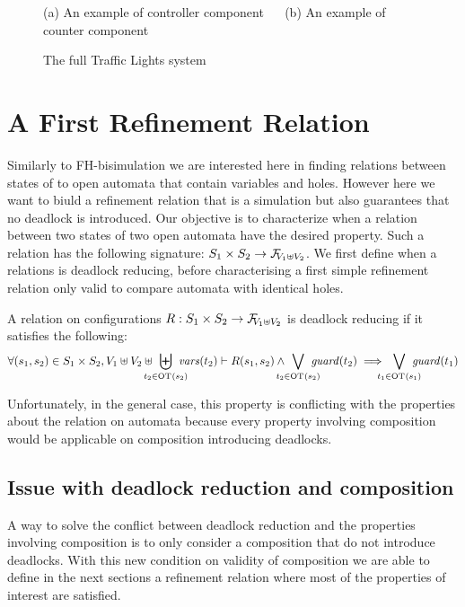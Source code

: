 \documentclass[runningheads]{llncs}
\begin{document}
\begin{figure}


\caption{(a) An example of controller component ~~  (b) An example of counter component}
\label{fig:ctlandcnt}
\end{figure}



\begin{figure}
\centering

\caption{The full Traffic Lights system}
\label{fig:tlf}
\end{figure}


\section{A First Refinement Relation}\label{sec:refinement}

Similarly to FH-bisimulation we are interested here in finding relations between states of to open automata that contain variables and holes. However here we want to biuld a refinement relation that is a simulation but also guarantees that no deadlock is introduced.
Our objective is to characterize when a relation between two states of two open automata have the desired property. Such a relation has the following signature: \( S_1 \times S_2 \to \rformulas[V_1 \uplus V_2]\).
We first define when a relations is deadlock reducing, before characterising a first simple refinement relation only valid to compare automata with identical holes.

\begin{definition}\label{def:dpwd}
A relation on configurations \(R: S_1 \times S_2 \to \rformulas[V_1 \uplus V_2]\) is deadlock reducing if  it satisfies the following:
\[ \forall \mpar{s_1, s_2} \in S_1 \times S_2, V_1 \uplus V_2 \uplus \biguplus_\subbox{t_2 \in \fOT{s_2}} \fvars{t_2} \vdash R\mpar{s_1, s_2} \wedge \bigvee_\subbox{t_2 \in \fOT{s_2}} \fguard{t_2} \implies \bigvee_\subbox{t_1 \in \fOT{s_1}} \fguard{t_1} \]
\end{definition}

Unfortunately, in the general case, this property is conflicting with the properties about the relation on automata because every property involving composition would be applicable on composition introducing deadlocks.

\subsection{Issue with deadlock reduction and composition}
A way to solve the conflict between deadlock reduction and the properties involving composition is to only consider a composition that do not introduce deadlocks.
With this new condition on validity of composition we are able to define in the next sections a refinement relation where most of the properties of interest are satisfied.
\end{document}
